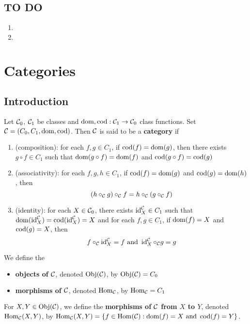 \documentclass{book}
\begin{document}
	
	\subsection{TO DO}
	\begin{enumerate} 
		\item {}
		\item 
	\end{enumerate}
	
	
	
	
	
	
	
	
	
	
	
	
	
	
	
	\newpage
	\section{Categories}
	
	\subsection{Introduction}
	
	\begin{defn}  
		Let $\mathcal{C}_0$, $\mathcal{C}_1$ be classes and $\operatorname{dom}, \operatorname{cod} : \mathcal{C}_1 \rightarrow \mathcal{C}_0$ class functions. Set $\mathcal{C} = (C_0, C_1, \operatorname{dom}, \operatorname{cod})$. Then $\mathcal{C}$ is said to be a \textbf{category} if 
		\begin{enumerate}
			\item (composition): for each $f,g \in C_1$, if $\operatorname{cod}(f) = \operatorname{dom}(g)$, then there exists $g \circ f \in C_1$ such that $\operatorname{dom}(g \circ f) = \operatorname{dom}(f)$ and $\operatorname{cod}(g \circ f) = \operatorname{cod}(g)$
			\item (associativity): for each $f,g,h \in C_1$, if $\operatorname{cod}(f) = \operatorname{dom}(g)$ and $\operatorname{cod}(g) = \operatorname{dom}(h)$, then $$(h \circ_{\mathcal{C}} g) \circ_{\mathcal{C}} f = h \circ_{\mathcal{C}} (g \circ_{\mathcal{C}} f)$$  
			\item (identity): for each $X \in \mathcal{C}_0$, there exists $\operatorname{id}^{\mathcal{C}}_{X} \in C_1$ such that $\operatorname{dom}(\operatorname{id}^{\mathcal{C}}_X) = \operatorname{cod}(\operatorname{id}^{\mathcal{C}}_X) = X$ and for each $f, g \in C_1$, if $\operatorname{dom}(f) = X$ and $\operatorname{cod}(g) = X$, then $$f \circ_{\mathcal{C}} \operatorname{id}^{\mathcal{C}}_X = f \text{ and } \operatorname{id}^{\mathcal{C}}_X \circ_{\mathcal{C}} g = g$$ 
		\end{enumerate}
		We define the
		\begin{itemize}
			\item \textbf{objects of $\mathcal{C}$}, denoted $\operatorname{Obj}(\mathcal{C})$, by $\operatorname{Obj}(\mathcal{C}) = C_0$
			\item \textbf{morphisms of $\mathcal{C}$}, denoted $\operatorname{Hom}_{\mathcal{C}}$, by $\operatorname{Hom}_{\mathcal{C}} = C_1$
		\end{itemize}
		For $X, Y \in \operatorname{Obj}(\mathcal{C})$, we define the \textbf{morphisms of $\mathcal{C}$ from $X$ to $Y$}, denoted $\operatorname{Hom}_{\mathcal{C}}(X, Y)$, by $\operatorname{Hom}_{\mathcal{C}}(X, Y) = \{f \in \operatorname{Hom}(\mathcal{C}): \operatorname{dom}(f) = X \text{ and } \operatorname{cod}(f) = Y\}$.
	\end{defn}
\end{document}
